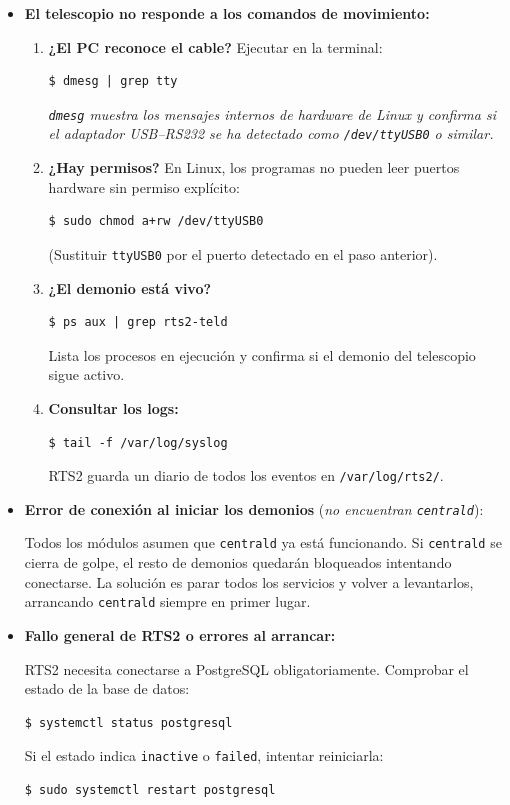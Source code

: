 \documentclass[12pt,a4paper,titlepage]{article}
\begin{document}
\begin{itemize}

  \item \textbf{El telescopio no responde a los comandos de movimiento:}
  \begin{enumerate}
    \item \textbf{¿El PC reconoce el cable?} Ejecutar en la terminal:
\begin{verbatim}
$ dmesg | grep tty
\end{verbatim}
    \textit{\texttt{dmesg} muestra los mensajes internos de hardware de Linux y confirma si el adaptador USB--RS232 se ha detectado como \texttt{/dev/ttyUSB0} o similar.}

    \item \textbf{¿Hay permisos?} En Linux, los programas no pueden leer puertos hardware sin permiso explícito:
\begin{verbatim}
$ sudo chmod a+rw /dev/ttyUSB0
\end{verbatim}
    (Sustituir \texttt{ttyUSB0} por el puerto detectado en el paso anterior).

    \item \textbf{¿El demonio está vivo?}
\begin{verbatim}
$ ps aux | grep rts2-teld
\end{verbatim}
    Lista los procesos en ejecución y confirma si el demonio del telescopio sigue activo.

    \item \textbf{Consultar los logs:}
\begin{verbatim}
$ tail -f /var/log/syslog
\end{verbatim}
    RTS2 guarda un diario de todos los eventos en \texttt{/var/log/rts2/}.
  \end{enumerate}

  \item \textbf{Error de conexión al iniciar los demonios} (\textit{no encuentran \texttt{centrald}}):

  Todos los módulos asumen que \texttt{centrald} ya está funcionando. Si \texttt{centrald} se cierra de golpe, el resto de demonios quedarán bloqueados intentando conectarse. La solución es parar todos los servicios y volver a levantarlos, arrancando \texttt{centrald} siempre en primer lugar.

  \item \textbf{Fallo general de RTS2 o errores al arrancar:}

  RTS2 necesita conectarse a PostgreSQL obligatoriamente. Comprobar el estado de la base de datos:
\begin{verbatim}
$ systemctl status postgresql
\end{verbatim}
  Si el estado indica \texttt{inactive} o \texttt{failed}, intentar reiniciarla:
\begin{verbatim}
$ sudo systemctl restart postgresql
\end{verbatim}


\end{itemize}
\end{document}
